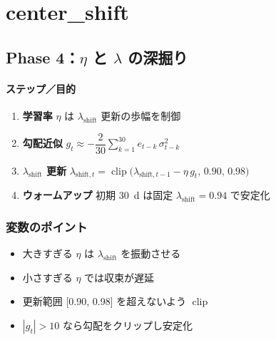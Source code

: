 
\section*{center\_shift}\nopagebreak[4]

\subsection*{Phase 4：$\eta$ と $\lambda$ の深掘り}\nopagebreak[4]
\paragraph{ステップ／目的}
\begin{flushleft}
\begin{enumerate}
  \item \textbf{学習率}
        \(\eta\) は $\lambda_{\text{shift}}$ 更新の歩幅を制御
  \item \textbf{勾配近似}
        \(g_t\approx-\dfrac{2}{30}\sum_{k=1}^{30}e_{t-k}\,\sigma_{t-k}^2\)
  \item \textbf{$\lambda_{\text{shift}}$ 更新}
        \(\lambda_{\text{shift},t}
          =\operatorname{clip}\bigl(\lambda_{\text{shift},t-1}
          -\eta\,g_t,\,0.90,\,0.98\bigr)\)
  \item \textbf{ウォームアップ}
        初期 30~d は固定 $\lambda_{\text{shift}}=0.94$ で安定化
\end{enumerate}
\end{flushleft}

\subsubsection*{変数のポイント}
\begin{flushleft}
\begin{itemize}
  \item 大きすぎる $\eta$ は \(\lambda_{\text{shift}}\) を振動させる
  \item 小さすぎる $\eta$ では収束が遅延
  \item 更新範囲 [0.90, 0.98] を超えないよう \(\operatorname{clip}\)
  \item $|g_t|>10$ なら勾配をクリップし安定化
\end{itemize}
\end{flushleft}

